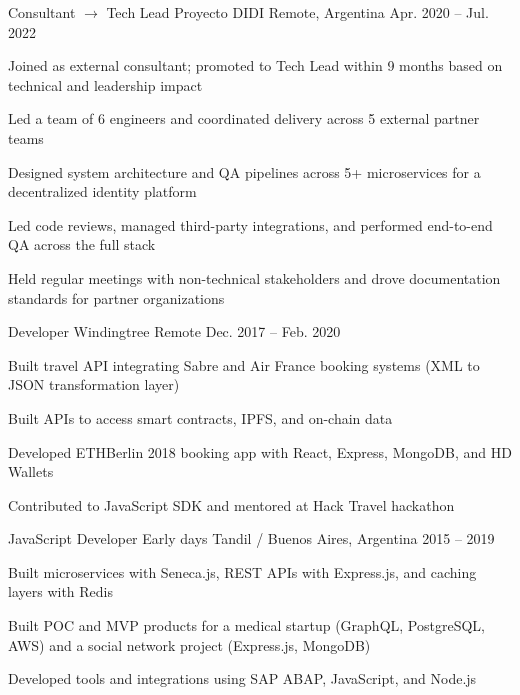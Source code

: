 \begin{cventries}
\cventry
{Consultant $\rightarrow$ Tech Lead} %
{Proyecto DIDI} %
{Remote, Argentina} %
{Apr. 2020 – Jul. 2022}
{
\begin{cvitems}
\item {Joined as external consultant; promoted to Tech Lead within 9 months based on technical and leadership impact}
\item {Led a team of 6 engineers and coordinated delivery across 5 external partner teams}
\item {Designed system architecture and QA pipelines across 5+ microservices for a decentralized identity platform}
\item {Led code reviews, managed third-party integrations, and performed end-to-end QA across the full stack}
\item {Held regular meetings with non-technical stakeholders and drove documentation standards for partner organizations}
\end{cvitems}
}

\cventry
{Developer} %
{Windingtree} %
{Remote} %
{Dec. 2017 – Feb. 2020}
{
\begin{cvitems}
\item {Built travel API integrating Sabre and Air France booking systems (XML to JSON transformation layer)}
\item {Built APIs to access smart contracts, IPFS, and on-chain data}
\item {Developed ETHBerlin 2018 booking app with React, Express, MongoDB, and HD Wallets}
\item {Contributed to JavaScript SDK and mentored at Hack Travel hackathon}
\end{cvitems}
}

\cventry
{JavaScript Developer} %
{Early days} %
{Tandil / Buenos Aires, Argentina} %
{2015 – 2019}
{
\begin{cvitems}
\item {Built microservices with Seneca.js, REST APIs with Express.js, and caching layers with Redis}
\item {Built POC and MVP products for a medical startup (GraphQL, PostgreSQL, AWS) and a social network project (Express.js, MongoDB)}
\item {Developed tools and integrations using SAP ABAP, JavaScript, and Node.js}
\end{cvitems}
}

\end{cventries}
